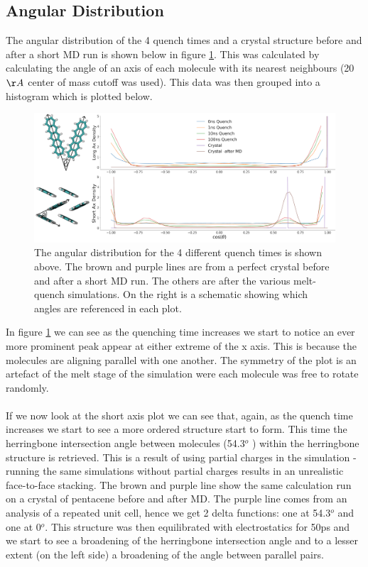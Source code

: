 \subsection{Angular Distribution}
The angular distribution of the 4 quench times and a crystal structure before and after a short MD run is shown below in figure \ref{fig:ang_dist}. This was calculated by calculating the angle of an axis of each molecule with its nearest neighbours (20 $\AA$ center of mass cutoff was used). This data was then grouped into a histogram which is plotted below.
\begin{figure}[H]
	\includegraphics[width=\textwidth]{./img/DifferentQuenchTimes/AngularDist.png}
	\caption{\label{fig:ang_dist}The angular distribution for the 4 different quench times is shown above. The brown and purple lines are from a perfect crystal before and after a short MD run. The others are after the various melt-quench simulations. On the right is a schematic showing which angles are referenced in each plot.}
\end{figure}
In figure \ref{fig:ang_dist} we can see as the quenching time increases we start to notice an ever more prominent peak appear at either extreme of the x axis. This is because the molecules are aligning parallel with one another. The symmetry of the plot is an artefact of the melt stage of the simulation were each molecule was free to rotate randomly.
\\\\
If we now look at the short axis plot we can see that, again, as the quench time increases we start to see a more ordered structure start to form. This time the herringbone intersection angle between molecules (54.3$^{o}$ \cite{PentaceneAngle}) within the herringbone structure is retrieved. This is a result of using partial charges in the simulation -running the same simulations without partial charges results in an unrealistic face-to-face stacking. The brown and purple line show the same calculation run on a crystal of pentacene before and after MD. The purple line comes from an analysis of a repeated unit cell, hence we get 2 delta functions: one at 54.3$^{o}$ and one at 0$^{o}$. This structure was then equilibrated with electrostatics for 50ps and we start to see a broadening of the herringbone intersection angle and to a lesser extent (on the left side) a broadening of the angle between parallel pairs.
